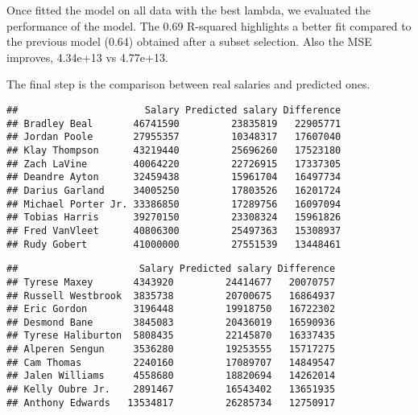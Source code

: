 \documentclass[
]{article}
\begin{document}
Once fitted the model on all data with the best lambda, we evaluated the
performance of the model. The 0.69 R-squared highlights a better fit
compared to the previous model (0.64) obtained after a subset selection.
Also the MSE improves, 4.34e+13 vs 4.77e+13.

The final step is the comparison between real salaries and predicted
ones.

\begin{verbatim}
##                      Salary Predicted salary Difference
## Bradley Beal       46741590         23835819   22905771
## Jordan Poole       27955357         10348317   17607040
## Klay Thompson      43219440         25696260   17523180
## Zach LaVine        40064220         22726915   17337305
## Deandre Ayton      32459438         15961704   16497734
## Darius Garland     34005250         17803526   16201724
## Michael Porter Jr. 33386850         17289756   16097094
## Tobias Harris      39270150         23308324   15961826
## Fred VanVleet      40806300         25497363   15308937
## Rudy Gobert        41000000         27551539   13448461
\end{verbatim}

\begin{verbatim}
##                     Salary Predicted salary Difference
## Tyrese Maxey       4343920         24414677   20070757
## Russell Westbrook  3835738         20700675   16864937
## Eric Gordon        3196448         19918750   16722302
## Desmond Bane       3845083         20436019   16590936
## Tyrese Haliburton  5808435         22145870   16337435
## Alperen Sengun     3536280         19253555   15717275
## Cam Thomas         2240160         17089707   14849547
## Jalen Williams     4558680         18820694   14262014
## Kelly Oubre Jr.    2891467         16543402   13651935
## Anthony Edwards   13534817         26285734   12750917
\end{verbatim}
\end{document}

